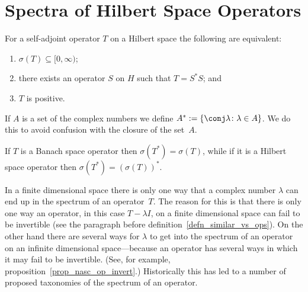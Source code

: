 \section{Spectra of Hilbert Space Operators}
\begin{prop} For a self-adjoint operator $T$ on a Hilbert space the following are
equivalent:
 \begin{enumerate}
    \item[(i)] $\sigma(T) \subseteq [0,\infty)$;
    \item[(ii)] there exists an operator $S$ on $H$ such that $T = S^*S$; and
    \item[(iii)] $T$ is positive.
 \end{enumerate}
\end{prop}

\begin{notn} If $A$ is a set of the complex numbers we
define $A^* := \{\conj\lambda \colon \lambda \in A\}$.  We do this to avoid confusion with the closure of the set~$A$.
\end{notn}

\begin{prop} If $T$ is a Banach space operator then $\sigma(T^*) = \sigma(T)$, while if it is a Hilbert space
operator then $\sigma(T^*) = (\sigma(T))^*$.
\end{prop}

In a finite dimensional space there is only one way that a complex number $\lambda$ can end up in the spectrum of an operator~$T$.
The reason for this is that there is only one way an operator, in this case $T - \lambda I$, on a finite dimensional space can fail
to be invertible (see the paragraph before definition~\ref{defn_similar_vs_ops}).  On the other hand there are several ways for $\lambda$
to get into the spectrum of an operator on an infinite dimensional space---because an operator has several ways in which it may fail
to be invertible. (See, for example, proposition~\ref{prop_nasc_op_invert}.) Historically this has led to a number of proposed
taxonomies of the spectrum of an operator.

